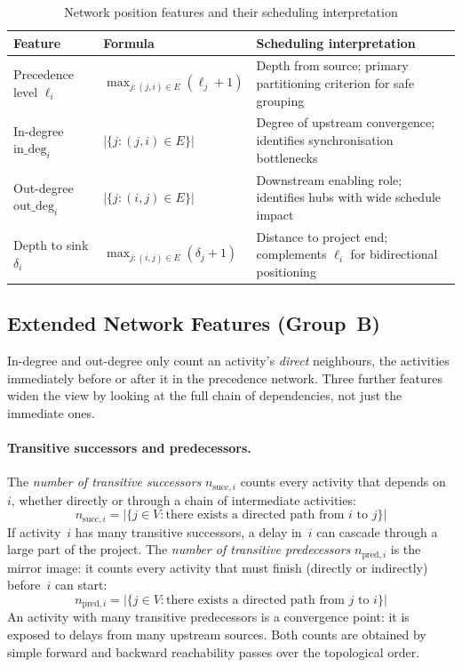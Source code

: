\begin{table}[ht]
\centering
\renewcommand{\arraystretch}{1.4}
\caption{Network position features and their scheduling
         interpretation}
\label{tab:net_features}
\begin{tabular}{llp{5.5cm}}
\hline
\textbf{Feature} &
\textbf{Formula} &
\textbf{Scheduling interpretation} \\
\hline
Precedence level $\ell_i$
    & $\max_{j:(j,i)\in E}(\ell_j+1)$
    & Depth from source; primary
      partitioning criterion for safe grouping \\[4pt]
In-degree $\mathrm{in\_deg}_i$
    & $|\{j:(j,i)\in E\}|$
    & Degree of upstream convergence;
      identifies synchronisation bottlenecks \\[4pt]
Out-degree $\mathrm{out\_deg}_i$
    & $|\{j:(i,j)\in E\}|$
    & Downstream enabling role;
      identifies hubs with wide schedule impact \\[4pt]
Depth to sink $\delta_i$
    & $\max_{j:(i,j)\in E}(\delta_j+1)$
    & Distance to project end; complements
      $\ell_i$ for bidirectional positioning \\
\hline
\end{tabular}
\end{table}

\subsection{Extended Network Features (Group~B)}
\label{subsec:net_ext_features}

In-degree and out-degree only count an activity's \emph{direct}
neighbours, the activities immediately before or after it in
the precedence network. Three further features widen the view
by looking at the full chain of dependencies, not just the
immediate ones.

\paragraph{Transitive successors and predecessors.}
The \textit{number of transitive successors}
$n_{\mathrm{succ},i}$ counts every activity that depends on~$i$,
whether directly or through a chain of intermediate activities:
\begin{equation}
    n_{\mathrm{succ},i} = |\{j \in V : \text{there exists a
    directed path from } i \text{ to } j\}|
    \label{eq:trans_succ}
\end{equation}
If activity~$i$ has many transitive successors, a delay in~$i$
can cascade through a large part of the project.
The \textit{number of transitive predecessors}
$n_{\mathrm{pred},i}$ is the mirror image: it counts every
activity that must finish (directly or indirectly) before~$i$
can start:
\begin{equation}
    n_{\mathrm{pred},i} = |\{j \in V : \text{there exists a
    directed path from } j \text{ to } i\}|
    \label{eq:trans_pred}
\end{equation}
An activity with many transitive predecessors is a
convergence point: it is exposed to delays from many upstream
sources. Both counts are obtained by simple forward and backward
reachability passes over the topological order.

